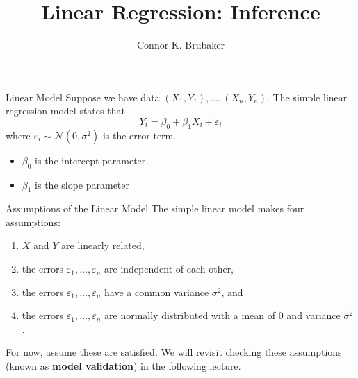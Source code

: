 \documentclass{beamer}
\title{Linear Regression: Inference}
\author{Connor K. Brubaker}
\institute{
Department of Statistics \\
Texas A\&M University
}
\date{}
\begin{document}
\maketitle

\begin{frame}{Linear Model}
    Suppose we have data $(X_1, Y_1), \ldots, (X_n, Y_n)$. The simple linear regression model states that 
    \begin{equation*}
        Y_i = \beta_0 + \beta_1 X_i + \varepsilon_i
    \end{equation*}
    where $\varepsilon_i \sim \mathcal{N}(0, \sigma^2)$ is the error term. 
    \begin{itemize}
        \item $\beta_0$ is the intercept parameter
        \item $\beta_1$ is the slope parameter
    \end{itemize}
\end{frame}

\begin{frame}{Assumptions of the Linear Model}
    The simple linear model makes four assumptions:
    \begin{enumerate}
        \item $X$ and $Y$ are linearly related,
        \item the errors $\varepsilon_1, \ldots, \varepsilon_n$ are independent of each other,
        \item the errors $\varepsilon_1, \ldots, \varepsilon_n$ have a common variance $\sigma^2$, and 
        \item the errors $\varepsilon_1, \ldots, \varepsilon_n$ are normally distributed with a mean of $0$ and variance $\sigma^2$.
    \end{enumerate}
    For now, assume these are satisfied. We will revisit checking these assumptions (known as \textbf{model validation}) in the following lecture. 
\end{frame}
\end{document}
